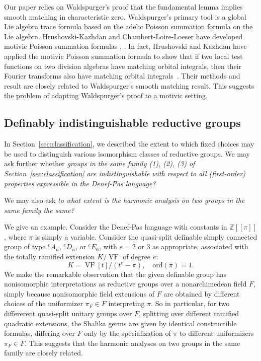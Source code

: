 \documentclass[12pt]{amsart}
\newcommand{\op}[1]{\operatorname{#1}}
\newcommand{\ring}[1]{{\mathbb #1}}
\def\VF{{\op{VF}}}
\newcommand\ord{\mathrm{ord}}
\theoremstyle{plain}
\theoremstyle{definition}
\begin{document}
Our paper relies on Waldspurger's proof that the fundamental lemma
implies smooth matching in characteristic zero.  Waldspurger's primary
tool is a global Lie algebra trace formula based on the adelic Poisson
summation formula on the Lie algebra.  Hrushovski-Kazhdan and
Chambert-Loire-Loeser have developed motivic Poisson summation
formulas \cite{hrushovski2009motivic}, \cite{chambert2013motivic}.  In
fact, Hrushovski and Kazhdan have applied the motivic Poisson
summation formula to show that if two local test functions on two division
algebras have matching orbital integrals, then their Fourier
transforms also have matching orbital integrals~\cite[Theorem
1.1]{hrushovski2009motivic}.  Their methods and result are closely
related to Waldspurger's smooth matching result.  This suggests the
problem of adapting Waldspurger's proof to a motivic setting.

\subsection{Definably indistinguishable reductive groups}

In Section~\ref{sec:classification}, we described the extent to which
fixed choices may be used to distinguish various isomorphism classes
of reductive groups.  We may ask further whether {\it groups in the
  same family (1), (2), (3) of Section~\ref{sec:classification} are
  indistinguishable with respect to all (first-order) properties
  expressible in the Denef-Pas language?}

We may also ask {\it to what extent is the harmonic analysis on two groups
in the same family the same?}

We give an example.  Consider the Denef-Pas language with constants in
$\ring{Z}[[\pi]]$, where $\pi$ is simply a variable.  Consider the
quasi-split definable simply connected group of type ${}^eA_n$,
${}^eD_n$, or ${}^eE_6$, with $e=2$ or $3$ as appropriate, associated
with the totally ramified extension $K/\VF$ of degree $e$:
\[
K = \VF[t]/(t^e - \pi),\quad \ord (\pi) = 1.
\]
We make the remarkable observation that the given definable group has
nonisomorphic interpretations as reductive groups over a
nonarchimedean field $F$, simply because nonisomorphic field
extensions of $F$ are obtained by different choices of the uniformizer
$\pi_F\in F$ interpreting $\pi$.  So in particular, for two differerent
quasi-split unitary groups over $F$, splitting over different ramified
quadratic extensions, the Shalika germs are given by identical
constructible formulas, differing over $F$ only by the specialization
of $\pi$ to different uniformizers $\pi_F\in F$.  This suggests that
the harmonic analyses on two groups in the same family are closely
related.
\end{document}
